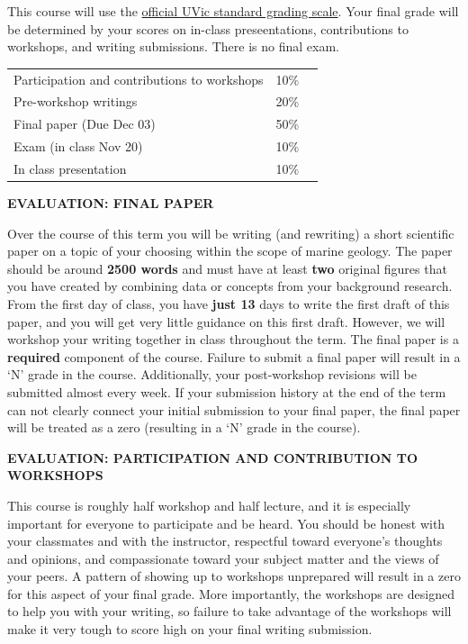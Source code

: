 \documentclass[11pt]{article}
\begin{document}
This course will use the \href{https://www.uvic.ca/calendar/future/undergrad/index.php#/policy/S1AAgoGuV?bc=true&bcCurrent=14%20-%20Grading&bcGroup=Undergraduate%20Academic%20Regulations&bcItemType=policies}{official UVic standard grading scale}. Your final grade will be determined by your scores on in-class preseentations, contributions to workshops, and writing submissions. There is no final exam.

\begin{center}
	\begin{tabular}{ L{.68\linewidth}R{.1\linewidth} R{.33\linewidth} }
		Participation and contributions to workshops & 10\% \\
		Pre-workshop writings                        & 20\% \\
		Final paper (Due Dec 03)                     & 50\% \\
		Exam (in class Nov 20)                       & 10\% \\
		In class presentation                        & 10\% \\
	\end{tabular}
\end{center}

\textbf{EVALUATION: FINAL PAPER}

Over the course of this term you will be writing (and rewriting) a short scientific paper on a topic of your choosing within the scope of marine geology. The paper should be around \textbf{2500 words} and must have at least \textbf{two} original figures that you have created by combining data or concepts from your background research. From the first day of class, you have \textbf{just 13} days to write the first draft of this paper, and you will get very little guidance on this first draft. However, we will workshop your writing together in class throughout the term. The final paper is a \textbf{required} component of the course. Failure to submit a final paper will result in a `N' grade in the course. Additionally, your post-workshop revisions will be submitted almost every week. If your submission history at the end of the term can not clearly connect your initial submission to your final paper, the final paper will be treated as a zero (resulting in a `N' grade in the course).

\textbf{EVALUATION: PARTICIPATION AND CONTRIBUTION TO WORKSHOPS}

This course is roughly half workshop and half lecture, and it is especially important for everyone to participate and be heard.
You should be honest with your classmates and with the instructor, respectful toward everyone's thoughts and opinions, and compassionate toward your subject matter and the views of your peers.
A pattern of showing up to workshops unprepared will result in a zero for this aspect of your final grade.
More importantly, the workshops are designed to help you with your writing, so failure to take advantage of the workshops will make it very tough to score high on your final writing submission.
\end{document}
